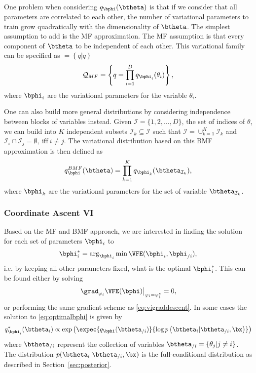 One problem when considering $q_{\bphi}(\btheta)$ is that if we consider that all parameters are correlated to each other, the number of variational parameters to train grow quadratically with the dimensionality of $\btheta$.
The simplest assumption to add is the \ac{MF} approximation.
The \ac{MF} assumption is that every component of $\btheta$ to be independent of each other.
This variational family can be specified as $ = \left\{q | q \right\}$
\begin{align}
    \mathcal{Q}_{MF}= \left\{q = \prod_{i=1}^D q_{\bphi_i}(\theta_i)\right\},
\end{align}
where $\bphi_i$ are the variational parameters for the variable $\theta_i$.

One can also build more general distributions by considering independence between blocks of variables instead.
Given $\mathcal{I}=\{1,2,\ldots,D\}$, the set of indices of $\theta$, we can build into $K$ independent subsets $\mathcal{I}_k \subseteq \mathcal{I}$ such that  $\mathcal{I} = \cup_{k=1}^K \mathcal{I}_{k}$ and $\mathcal{I}_i \cap \mathcal{I}_j=\emptyset,~\mathrm{iff}~i \neq j$.
The variational distribution based on this \ac{BMF} approximation is then defined as
\begin{align}
    q^{BMF}_{\bphi}(\btheta) = \prod_{k=1}^K q_{\bphi_k}(\btheta_{\mathcal{I}_k}),
\end{align}
where $\bphi_k$ are the variational parameters for the set of variable $\btheta_{\mathcal{I}_k}$.

\subsubsection{Coordinate Ascent VI}

Based on the \ac{MF} and \ac{BMF} approach, we are interested in finding the solution for each set of parameters $\bphi_i$ to
\begin{align}
    \bphi_i^* = \arg_{\bphi_i}\min \VFE(\bphi_i, \bphi_{/i}),
    \label{eq:optimalbphi}
\end{align}
i.e. by keeping all other parameters fixed, what is the optimal $\bphi_i^*$.
This can be found either by solving
\begin{align}
\left.\grad_{\varphi_i}\VFE(\bphi)\right\vert_{\varphi_i=\varphi_i^*} = 0,
\end{align}
or performing the same gradient scheme as \eqref{eq:vigraddescent}.
In some cases the solution to \eqref{eq:optimalbphi} is given by
\begin{align}
q_{\bphi_i}^*(\btheta_i) \propto \exp\left(\expec{q_{\bphi}(\btheta_{/i})}{\log p\left(\btheta_i|\btheta_{/i},\bx\right)}\right)
\end{align}
where $\btheta_{/i}$ represent the collection of variables $\btheta_{/i} = \{\theta_j | j \neq i\}$.
The distribution $p(\btheta_i|\btheta_{/i},\bx)$ is the full-conditional distribution as described in Section~\ref{sec:posterior}.

